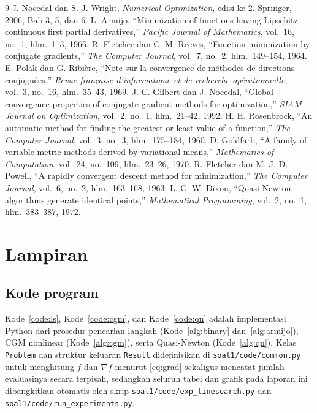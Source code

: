 \documentclass[12pt,a4paper]{article}
\begin{document}
\renewcommand{\refname}{Referensi}
\begin{thebibliography}{9}
 J. Nocedal dan S. J. Wright, \emph{Numerical Optimization}, edisi ke-2. Springer, 2006, Bab 3, 5, dan 6.
 L. Armijo, ``Minimization of functions having Lipschitz continuous first partial derivatives,'' \emph{Pacific Journal of Mathematics}, vol.~16, no.~1, hlm.~1--3, 1966.
 R. Fletcher dan C. M. Reeves, ``Function minimization by conjugate gradients,'' \emph{The Computer Journal}, vol.~7, no.~2, hlm.~149--154, 1964.
 E. Polak dan G. Ribi\`ere, ``Note sur la convergence de m\'ethodes de directions conjugu\'ees,'' \emph{Revue fran\c{c}aise d'informatique et de recherche op\'erationnelle}, vol.~3, no.~16, hlm.~35--43, 1969.
 J. C. Gilbert dan J. Nocedal, ``Global convergence properties of conjugate gradient methods for optimization,'' \emph{SIAM Journal on Optimization}, vol.~2, no.~1, hlm.~21--42, 1992.
 H. H. Rosenbrock, ``An automatic method for finding the greatest or least value of a function,'' \emph{The Computer Journal}, vol.~3, no.~3, hlm.~175--184, 1960.
 D. Goldfarb, ``A family of variable-metric methods derived by variational means,'' \emph{Mathematics of Computation}, vol.~24, no.~109, hlm.~23--26, 1970.
 R. Fletcher dan M. J. D. Powell, ``A rapidly convergent descent method for minimization,'' \emph{The Computer Journal}, vol.~6, no.~2, hlm.~163--168, 1963.
 L. C. W. Dixon, ``Quasi-Newton algorithms generate identical points,'' \emph{Mathematical Programming}, vol.~2, no.~1, hlm.~383--387, 1972.
\end{thebibliography}

\appendix
\renewcommand{\thelstlisting}{A.\arabic{lstlisting}}
\section{Lampiran}
\subsection{Kode program}
Kode~\ref{code:ls}, Kode~\ref{code:cgm}, dan Kode~\ref{code:qn} adalah implementasi Python dari prosedur pencarian
langkah (Kode~\ref{alg:binary} dan~\ref{alg:armijo}), CGM nonlinear (Kode~\ref{alg:cgm}), serta Quasi-Newton
(Kode~\ref{alg:qn}). Kelas \texttt{Problem} dan struktur keluaran \texttt{Result} didefinisikan di
\texttt{soal1/code/common.py} untuk menghitung $f$ dan $\nabla f$ menurut \eqref{eq:grad} sekaligus mencatat jumlah
evaluasinya secara terpisah, sedangkan seluruh tabel dan grafik pada laporan ini dibangkitkan otomatis oleh skrip
\texttt{soal1/code/exp\_linesearch.py} dan \texttt{soal1/code/run\_experiments.py}.



\end{document}
